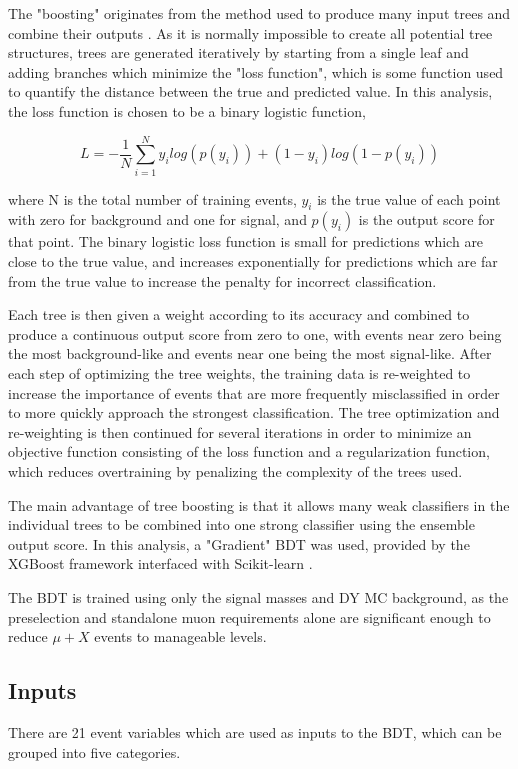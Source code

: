 The "boosting" originates from the method used to produce many input trees and combine their outputs \cite{GradBoost}. 
As it is normally impossible to create all potential tree structures, trees are generated iteratively by starting from a single leaf and adding branches which minimize the "loss function", which is some function used to quantify the distance between the true and predicted value.
In this analysis, the loss function is chosen to be a binary logistic function,

\begin{equation}
	\label{binLogFunc}
	L = - \frac{1}{N} \sum_{i=1}^{N} y_i log(p(y_i)) + (1-y_i) log(1-p(y_i))
\end{equation} 

where N is the total number of training events, $y_i$ is the true value of each point with zero for background and one for signal, and $p(y_i)$ is the output score for that point.
The binary logistic loss function is small for predictions which are close to the true value, and increases exponentially for predictions which are far from the true value to increase the penalty for incorrect classification.

Each tree is then given a weight according to its accuracy and combined to produce a continuous output score from zero to one, with events near zero being the most background-like and events near one being the most signal-like. 
After each step of optimizing the tree weights, the training data is re-weighted to increase the importance of events that are more frequently misclassified in order to more quickly approach the strongest classification.
The tree optimization and re-weighting is then continued for several iterations in order to minimize an objective function consisting of the loss function and a regularization function, which reduces overtraining by penalizing the complexity of the trees used.

The main advantage of tree boosting is that it allows many weak classifiers in the individual trees to be combined into one strong classifier using the ensemble output score.
In this analysis, a "Gradient" BDT was used, provided by the XGBoost framework \cite{XGBoost} interfaced with Scikit-learn \cite{scikit}. 

The BDT is trained using only the signal masses and DY MC background, as the preselection and standalone muon requirements alone are significant enough to reduce $\mu+X$ events to manageable levels. 

\subsection{Inputs}
There are 21 event variables which are used as inputs to the BDT, which can be grouped into five categories.

